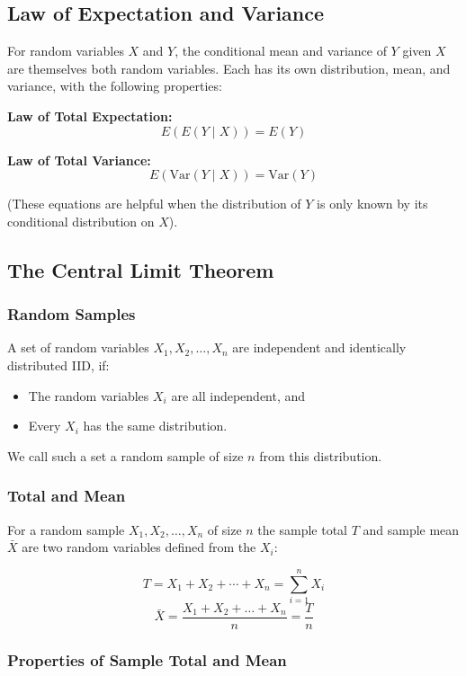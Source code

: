 \subsection*{Law of Expectation and Variance}

For random variables $X$ and $Y$, the conditional mean and variance of $Y$ given $X$ are themselves both random variables. Each has its own distribution, mean, and variance, with the following properties:

\textbf{Law of Total Expectation:}
$$ E(E(Y\mid X)) = E(Y)$$

\textbf{Law of Total Variance:}
$$ E(\text{Var}(Y\mid X)) = \text{Var}(Y)$$

(These equations are helpful when the distribution of $Y$ is only known by its conditional distribution on $X$).

\subsection*{The Central Limit Theorem}

\subsubsection*{Random Samples}

A set of random variables $X_1, X_2, \ldots, X_n$ are independent and identically distributed IID, if:

\begin{itemize}
    \item The random variables $X_i$ are all independent, and
    \item Every $X_i$ has the same distribution.
\end{itemize}

We call such a set a random sample of size $n$ from this distribution.

\subsubsection*{Total and Mean}

For a random sample $X_1,X_2,\ldots,X_n$ of size $n$ the sample total $T$ and sample mean $\bar{X}$ are two random variables defined from the $X_i$:

$$ T = X_1 + X_2 + \cdots + X_n = \sum^n_{i=1} X_i $$
$$ \bar{X} = \frac{X_1+X_2+\ldots +X_n}{n} = \frac{T}{n} $$

\subsubsection*{Properties of Sample Total and Mean}

